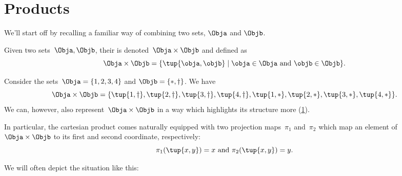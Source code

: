 

\section{Products}
\label{sec:combination-products}

We'll start off by recalling a familiar way of combining two sets, $\Obja$ and $\Objb$.


\begin{definition}
    \label{def:cartesian-product}
    Given two sets~$\Obja,\Objb$, their \emph{} is denoted~$\Obja \times  \Objb$ and defined as
    \begin{equation*}
        \Obja \times \Objb =\{ \tup{\obja,\objb}\mid \obja \in \Obja \text{ and } \objb \in \Objb\}.
    \end{equation*}
\end{definition}

\begin{example}
    Consider the sets~$\Obja = \{1, 2, 3, 4\}$ and $\Objb = \{ \ast, \dagger \}$.
    We have
    \begin{equation*}
        \Obja \times \Objb = \{ \tup{1, \dagger}, \tup{2, \dagger}, \tup{3, \dagger}, \tup{4, \dagger}, \tup{1, *}, \tup{2, *}, \tup{3, *}, \tup{4, *} \}.
    \end{equation*}
    We can, however, also represent~$\Obja \times \Objb$ in a way which highlights its structure more (\cref{fig:example_cartesian}).

    \begin{figure}[h!]
        \begin{center}
        \end{center}
        \caption{\label{fig:example_cartesian}}
    \end{figure}
    In particular, the cartesian product comes naturally equipped with two projection maps~$\pi_1$ and~$\pi_2$ which map an element of~$\Obja \times \Objb$ to its first and second coordinate, respectively:
    \begin{equation*}
        \pi_1(\tup{x,y}) =  x \text{ and } \pi_2(\tup{x,y}) = y.
    \end{equation*}

    We will often depict the situation like this:
    \begin{center}
    \end{center}
\end{example}

